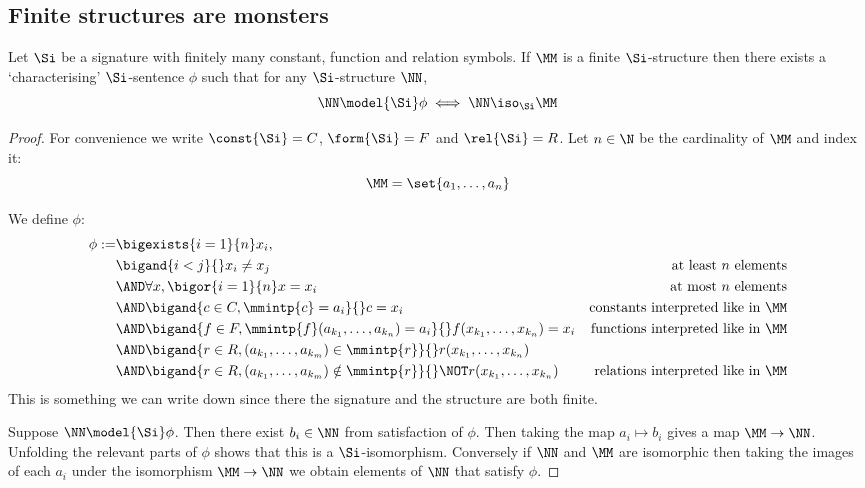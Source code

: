 \subsection{Finite structures are monsters}
\begin{lem}
    Let $\Si$ be a signature with finitely many constant, 
    function and relation symbols.
    If $\MM$ is a finite $\Si$-structure then there exists a `characterising'
    $\Si$-sentence $\phi$ such that for any $\Si$-structure $\NN$,
    \[\NN \model{\Si} \phi \iff \NN \iso_\Si \MM\]
\end{lem}
\begin{proof}
    For convenience we write $\const{\Si} = C$, $\form{\Si} = F$
    and $\rel{\Si} = R$.
    Let $n \in \N$ be the cardinality of $\MM$ and index it:
    \[\MM = \set{a_1,\dots,a_n}\]

    We define $\phi$:
    \begin{align*}
        \phi := &\bigexists{i = 1}{n} x_i,\\
        & \bigand{i < j}{} x_i \ne x_j &\text{at least $n$ elements}\\
        & \AND \forall x, \bigor{i = 1}{n} x = x_i 
        &\text{at most $n$ elements}\\
        & \AND \bigand{c \in C, \mmintp{c} = a_i}{} c = x_i
        &\text{constants interpreted like in $\MM$}\\
        & \AND \bigand{f \in F, \mmintp{f}(a_{k_1},\dots,a_{k_n}) = a_i}{} 
        f(x_{k_1},\dots,x_{k_n}) = x_i
        &\text{functions interpreted like in $\MM$}\\
        & \AND \bigand{r \in R,
        (a_{k_1},\dots,a_{k_m}) \in \mmintp{r}}{}
        r(x_{k_1},\dots,x_{k_n})\\
        & \AND \bigand{r \in R,
        (a_{k_1},\dots,a_{k_m}) \notin \mmintp{r}}{}
        \NOT r(x_{k_1},\dots,x_{k_n}) 
        &\text{relations interpreted like in $\MM$}
    \end{align*}
    This is something we can write down since there the signature and the 
    structure are both finite.
    
    Suppose $\NN \model{\Si} \phi$.
    Then there exist $b_i \in \NN$ from satisfaction of $\phi$.
    Then taking the map $a_i \mapsto b_i$ gives a map $\MM \to \NN$.
    Unfolding the relevant parts of $\phi$ 
    shows that this is a $\Si$-isomorphism.
    Conversely if $\NN$ and $\MM$ are isomorphic then taking the images of 
    each $a_i$ under the isomorphism $\MM \to \NN$ 
    we obtain elements of $\NN$ that satisfy $\phi$.
\end{proof}


